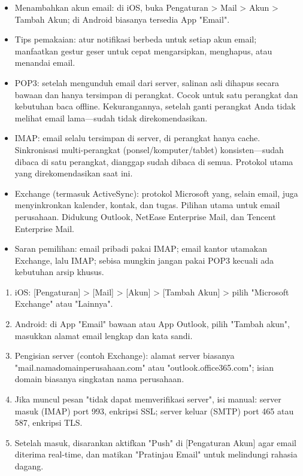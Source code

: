 
\begin{itemize}
  \item Menambahkan akun email: di iOS, buka Pengaturan > Mail > Akun > Tambah Akun; di Android biasanya tersedia App "Email".
  \item Tips pemakaian: atur notifikasi berbeda untuk setiap akun email; manfaatkan gestur geser untuk cepat mengarsipkan, menghapus, atau menandai email.
\end{itemize}


\begin{itemize}
  \item POP3: setelah mengunduh email dari server, salinan asli dihapus secara bawaan dan hanya tersimpan di perangkat. Cocok untuk satu perangkat dan kebutuhan baca offline. Kekurangannya, setelah ganti perangkat Anda tidak melihat email lama—sudah tidak direkomendasikan.
  \item IMAP: email selalu tersimpan di server, di perangkat hanya cache. Sinkronisasi multi-perangkat (ponsel/komputer/tablet) konsisten—sudah dibaca di satu perangkat, dianggap sudah dibaca di semua. Protokol utama yang direkomendasikan saat ini.
  \item Exchange (termasuk ActiveSync): protokol Microsoft yang, selain email, juga menyinkronkan kalender, kontak, dan tugas. Pilihan utama untuk email perusahaan. Didukung Outlook, NetEase Enterprise Mail, dan Tencent Enterprise Mail.
  \item Saran pemilihan: email pribadi pakai IMAP; email kantor utamakan Exchange, lalu IMAP; sebisa mungkin jangan pakai POP3 kecuali ada kebutuhan arsip khusus.
\end{itemize}


\begin{enumerate}
  \item iOS: [Pengaturan] > [Mail] > [Akun] > [Tambah Akun] > pilih "Microsoft Exchange" atau "Lainnya".
  \item Android: di App "Email" bawaan atau App Outlook, pilih "Tambah akun", masukkan alamat email lengkap dan kata sandi.
  \item Pengisian server (contoh Exchange): alamat server biasanya "mail.namadomainperusahaan.com" atau "outlook.office365.com"; isian domain biasanya singkatan nama perusahaan.
  \item Jika muncul pesan "tidak dapat memverifikasi server", isi manual: server masuk (IMAP) port 993, enkripsi SSL; server keluar (SMTP) port 465 atau 587, enkripsi TLS.
  \item Setelah masuk, disarankan aktifkan "Push" di [Pengaturan Akun] agar email diterima real-time, dan matikan "Pratinjau Email" untuk melindungi rahasia dagang.
\end{enumerate}

